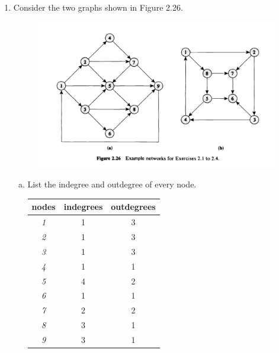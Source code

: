 \documentclass{report}
\begin{document}
\begin{enumerate}[2.1]
    \item Consider the two graphs shown in Figure 2.26.
    \begin{figure}[h]
        \includegraphics*[scale = 0.4]{figura 2.26.png}
    \end{figure}
    \begin{enumerate}[(a)]
        \item List the indegree and outdegree of every node.
        \begin{table}[h]
            \centering
            \begin{tabular}{|c|c|c|}
            \hline
            \textbf{nodes} & \textbf{indegrees} & \textbf{outdegrees} \\ \hline
            \textit{1}     & 1                  & 3                   \\ \hline
            \textit{2}     & 1                  & 3                   \\ \hline
            \textit{3}     & 1                  & 3                   \\ \hline
            \textit{4}     & 1                  & 1                   \\ \hline
            \textit{5}     & 4                  & 2                   \\ \hline
            \textit{6}     & 1                  & 1                   \\ \hline
            \textit{7}     & 2                  & 2                   \\ \hline
            \textit{8}     & 3                  & 1                   \\ \hline
            \textit{9}     & 3                  & 1                   \\ \hline

\end{tabular}
\end{table}
\end{enumerate}
\end{enumerate}
\end{document}
